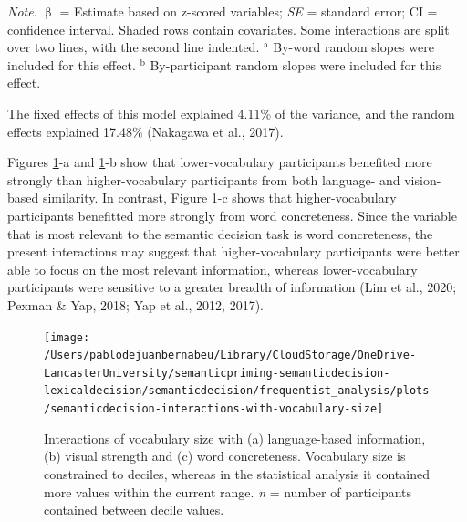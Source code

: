 \documentclass[
  12pt,
  man,floatsintext]{apa7}
\begin{document}
\begin{table}[!h]
\begin{threeparttable}
\begin{tabular}[t]{lrrrrr}
\bottomrule
\end{tabular}
\begin{tablenotes}
\item \textit{\linebreak} 
\item \textit{Note}. $\upbeta$ = Estimate based on z-scored variables; \textit{SE} = standard error; \linebreak \phantom{.}CI = confidence interval. Shaded rows contain covariates. Some interactions are \linebreak \phantom{.}split over two lines, with the second line indented. \linebreak \linebreak \phantom{.}$^{\text{a}}$ By-word random slopes were included for this effect. \linebreak \phantom{.}$^{\text{b}}$ By-participant random slopes were included for this effect.
\end{tablenotes}
\end{threeparttable}
\end{table}

The fixed effects of this model explained 4.11\% of the variance, and the random effects explained 17.48\% (Nakagawa et al., 2017).

Figures \ref{fig:semanticdecision-interactions-with-vocabulary-size}-a and \ref{fig:semanticdecision-interactions-with-vocabulary-size}-b show that lower-vocabulary participants benefited more strongly than higher-vocabulary participants from both language- and vision-based similarity. In contrast, Figure \ref{fig:semanticdecision-interactions-with-vocabulary-size}-c shows that higher-vocabulary participants benefitted more strongly from word concreteness. Since the variable that is most relevant to the semantic decision task is word concreteness, the present interactions may suggest that higher-vocabulary participants were better able to focus on the most relevant information, whereas lower-vocabulary participants were sensitive to a greater breadth of information (Lim et al., 2020; Pexman \& Yap, 2018; Yap et al., 2012, 2017).



\begin{figure}

{\centering \texttt{[image: /Users/pablodejuanbernabeu/Library/CloudStorage/OneDrive-LancasterUniversity/semanticpriming-semanticdecision-lexicaldecision/semanticdecision/frequentist\_analysis/plots/semanticdecision-interactions-with-vocabulary-size]} 

}

\caption{Interactions of vocabulary size with (a) language-based information, (b) visual strength and (c) word concreteness. Vocabulary size is constrained to deciles, whereas in the statistical analysis it contained more values within the current range. \emph{n} = number of participants contained between decile values.}\label{fig:semanticdecision-interactions-with-vocabulary-size}
\end{figure}
\end{document}
